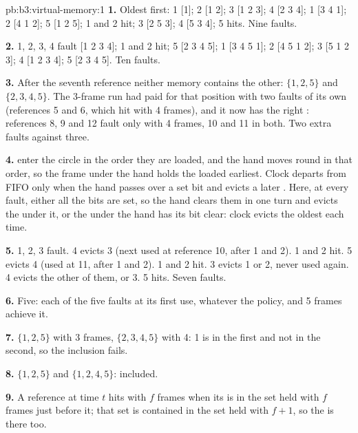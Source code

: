 \begin{solution}{pb:b3:virtual-memory:1}
\textbf{1.} Oldest first: 1 [1]; 2 [1 2]; 3 [1 2 3]; 4 [2 3 4]; 1 [3 4 1]; 2 [4 1 2]; 5 [1 2 5]; 1 and 2 hit; 3 [2 5 3]; 4 [5 3 4]; 5 hits. Nine faults.

\textbf{2.} 1, 2, 3, 4 fault [1 2 3 4]; 1 and 2 hit; 5 [2 3 4 5]; 1 [3 4 5 1]; 2 [4 5 1 2]; 3 [5 1 2 3]; 4 [1 2 3 4]; 5 [2 3 4 5]. Ten faults.

\textbf{3.} After the seventh reference neither memory contains the other: $\{1, 2, 5\}$ and $\{2, 3, 4, 5\}$. The 3-frame run had paid for that position with two faults of its own (references 5 and 6, which hit with 4 frames), and it now has the right : references 8, 9 and 12 fault only with 4 frames, 10 and 11 in both. Two extra faults against three.

\textbf{4.}  enter the circle in the order they are loaded, and the hand moves round in that order, so the frame under the hand holds the  loaded earliest. Clock departs from FIFO only when the hand passes over a set bit and evicts a later . Here, at every fault, either all the bits are set, so the hand clears them in one turn and evicts the  under it, or the  under the hand has its bit clear: clock evicts the oldest  each time.

\textbf{5.} 1, 2, 3 fault. 4 evicts 3 (next used at reference 10, after 1 and 2). 1 and 2 hit. 5 evicts 4 (used at 11, after 1 and 2). 1 and 2 hit. 3 evicts 1 or 2, never used again. 4 evicts the other of them, or 3. 5 hits. Seven faults.

\textbf{6.} Five: each of the five  faults at its first use, whatever the policy, and 5 frames achieve it.

\textbf{7.} $\{1, 2, 5\}$ with 3 frames, $\{2, 3, 4, 5\}$ with 4:  1 is in the first and not in the second, so the inclusion fails.

\textbf{8.} $\{1, 2, 5\}$ and $\{1, 2, 4, 5\}$: included.

\textbf{9.} A reference at time $t$ hits with $f$ frames when its  is in the set held with $f$ frames just before it; that set is contained in the set held with $f + 1$, so the  is there too.


\end{solution}
